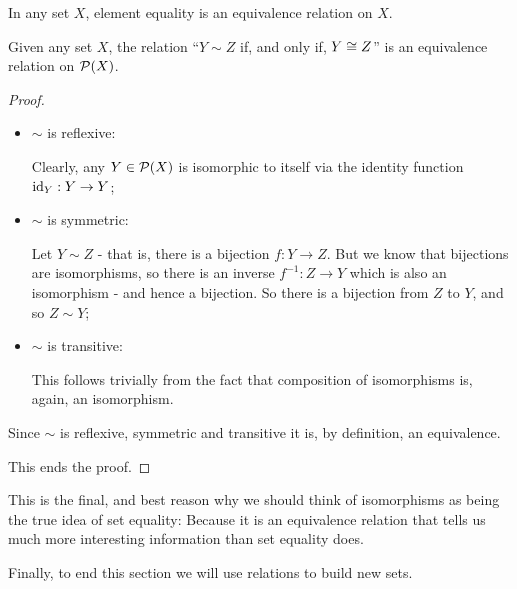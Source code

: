 \begin{lemma}
	In any set $X$, element equality is an equivalence relation on $X$.
\end{lemma}

\begin{lemma}
	Given any set $X$, the relation ``$Y\sim Z$ if, and only if, $Y\cong Z$'' is an equivalence relation on $\mathcal P(X)$.
\end{lemma}
\begin{proof}
	\begin{itemize}
		\item $\sim$ is reflexive:
		
		Clearly, any $Y\in \mathcal P(X)$ is isomorphic to itself via the identity function ${\rm id}_Y:Y\to Y$;
		
		\item $\sim$ is symmetric:
		
		Let $Y\sim Z$ - that is, there is a bijection $f:Y\to Z$. But we know that bijections are isomorphisms, so there is an inverse $f^{-1}:Z\to Y$ which is also an isomorphism - and hence a bijection. So there is a bijection from $Z$ to $Y$, and so $Z\sim Y$;
		
		\item $\sim$ is transitive:
		
		This follows trivially from the fact that composition of isomorphisms is, again, an isomorphism.
	\end{itemize}

Since $\sim$ is reflexive, symmetric and transitive it is, by definition, an equivalence.

This ends the proof.
\end{proof}

This is the final, and best reason why we should think of isomorphisms as being the true idea of set equality: Because it is an equivalence relation that tells us much more interesting information than set equality does.

\bigskip
Finally, to end this section we will use relations to build new sets.


